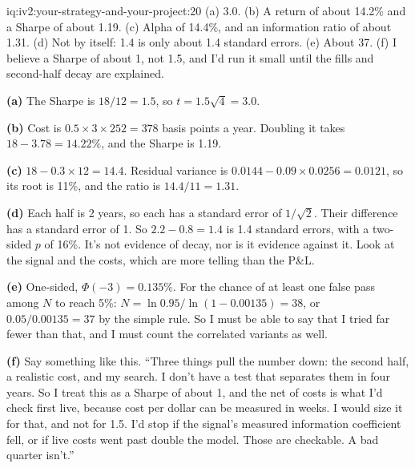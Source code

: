 \begin{solution}{iq:iv2:your-strategy-and-your-project:20}
(a) 3.0. (b) A return of about 14.2\% and a Sharpe of about 1.19. (c) Alpha of 14.4\%, and an information ratio of about 1.31. (d) Not by itself: 1.4 is only about 1.4 standard errors. (e) About 37. (f) I believe a Sharpe of about 1, not 1.5, and I'd run it small until the fills and second-half decay are explained.

\textbf{(a)} The Sharpe is $18/12 = 1.5$, so $t = 1.5\sqrt{4} = 3.0$.

\textbf{(b)} Cost is $0.5 \times 3 \times 252 = 378$ basis points a year. Doubling it takes $18 - 3.78 = 14.22\%$, and the Sharpe is 1.19.

\textbf{(c)} $18 - 0.3 \times 12 = 14.4$. Residual variance is $0.0144 - 0.09 \times 0.0256 = 0.0121$, so its root is 11\%, and the ratio is $14.4/11 = 1.31$.

\textbf{(d)} Each half is 2 years, so each has a standard error of $1/\sqrt{2}$. Their difference has a standard error of 1. So $2.2 - 0.8 = 1.4$ is 1.4 standard errors, with a two-sided $p$ of 16\%. It's not evidence of decay, nor is it evidence against it. Look at the signal and the costs, which are more telling than the P\&L.

\textbf{(e)} One-sided, $\Phi(-3) = 0.135\%$. For the chance of at least one false pass among $N$ to reach 5\%: $N = \ln 0.95/\ln(1 - 0.00135) = 38$, or $0.05/0.00135 = 37$ by the simple rule. So I must be able to say that I tried far fewer than that, and I must count the correlated variants as well.

\textbf{(f)} Say something like this. ``Three things pull the number down: the second half, a realistic cost, and my search. I don't have a test that separates them in four years. So I treat this as a Sharpe of about 1, and the net of costs is what I'd check first live, because cost per dollar can be measured in weeks. I would size it for that, and not for 1.5. I'd stop if the signal's measured information coefficient fell, or if live costs went past double the model. Those are checkable. A bad quarter isn't.''

\end{solution}
